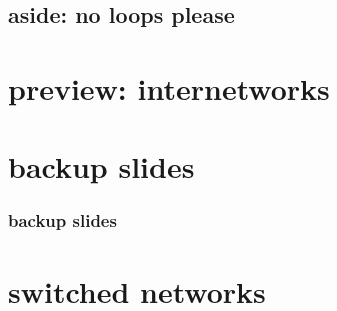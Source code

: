 




\subsection{aside: no loops please}



\section{preview: internetworks}



\section{backup slides}
\begin{frame}\frametitle{backup slides}
\end{frame}

\section{switched networks}



